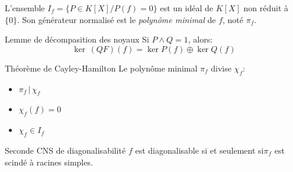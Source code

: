 \documentclass[french, a4paper, 11pt, twocolumn]{article}
\newcommand{\ssi}{si et seulement si\xspace}		%
\newcommand{\co}{\left[}         %
\newcommand{\cf}{\right]}        %
\newcommand{\cof}[1]{\co #1 \cf} %
\begin{document}
\begin{definition}
  L'ensemble \(I_{f}=\lbrace P\in K\cof{X} \slash P(f)=0\rbrace\) est un idéal de \(K\cof{X}\) non réduit à \(\lbrace 0 \rbrace\). Son générateur normalisé est le \emph{polynôme minimal} de \(f\), noté \(\pi_{f}\).
\end{definition}

\begin{theoreme}{Lemme de décompasition des noyaux}
  Si \(P\wedge Q = 1\), alors:
  \[\ker\, (QF)(f) = \ker P(f)\oplus \ker Q(f)\]
\end{theoreme}

\begin{theoreme}{Théorème de Cayley-Hamilton}
  Le polynôme minimal \(\pi_{f}\) divise \(\chi_{f}\):
  \begin{itemize}[label=\(\bullet\)]
    \item \(\pi_{f}\,|\,\chi_{f}\)
    \item \(\chi_{f}(f) = 0\)
    \item \(\chi_{f} \in I_{f}\)
  \end{itemize}
\end{theoreme}

\begin{theoreme}{Seconde CNS de diagonalisabilité}
  \(f\) est diagonalisable \ssi \(\pi_{f}\) est scindé à racines simples.
\end{theoreme}
\end{document}

